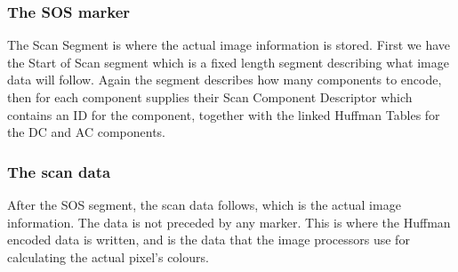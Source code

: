 \begin{infobox}
\subsubsection{The SOS marker}
\begin{centering}
\end{centering}
The Scan Segment is where the actual image information is stored. First we have the Start of Scan segment which is a fixed length segment describing what image data will follow. Again the segment describes how many components to encode, then for each component supplies their Scan Component Descriptor which contains an ID for the component, together with the linked Huffman Tables for the DC and AC components.

\begin{centering}
\end{centering}

\vspace{4mm}
\subsubsection{The scan data}
\vspace{-2.5mm}
After the SOS segment, the scan data follows, which is the actual image information.
The data is not preceded by any marker.
This is where the Huffman encoded data is written, and is the data that the image processors use for calculating the actual pixel's colours.


\end{infobox}
